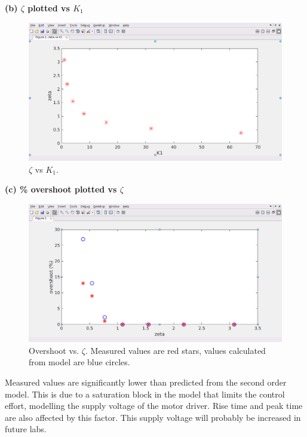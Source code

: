 \documentclass[11pt,a4paper]{article}
\begin{document}
\begin{enumerate}
\textbf{(b) $\zeta$ plotted vs $K_{1}$}
\begin{figure}[H]
\includegraphics[width=\textwidth]{imglab/lab2sol_zetavsk.png}
\caption{$\zeta$ vs $K_{1}$. }
\label{fig:zetavsk}
\end{figure}

\textbf{(c) \% overshoot plotted vs $\zeta$}
\begin{figure}[H]
\includegraphics[width=\textwidth]{imglab/lab2sol_osvszeta.png}
\caption{Overshoot vs. $\zeta$. Measured values are red stars, values calculated from model are blue circles. }
\label{fig:osvszeta}
\end{figure}

Measured values are significantly lower than predicted from the second order model. This is due to a saturation block in the model that limits the control effort, modelling the supply voltage of the motor driver. Rise time and peak time are also affected by this factor. This supply voltage will probably be increased in future labs. 


\end{enumerate}
\end{document}
